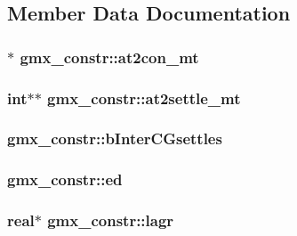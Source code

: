 \subsection{\-Member \-Data \-Documentation}
\hypertarget{structgmx__constr_a05db09c4cf1f83756a9221938a5a03ef}{
\subsubsection[{at2con\-\_\-mt}]{$\ast$ {\bf gmx\-\_\-constr\-::at2con\-\_\-mt}}}\label{structgmx__constr_a05db09c4cf1f83756a9221938a5a03ef}
\hypertarget{structgmx__constr_a0fdb6ced423b2244abcd97464072fcc3}{
\subsubsection[{at2settle\-\_\-mt}]{\setlength{\rightskip}{0pt plus 5cm}int$\ast$$\ast$ {\bf gmx\-\_\-constr\-::at2settle\-\_\-mt}}}\label{structgmx__constr_a0fdb6ced423b2244abcd97464072fcc3}
\hypertarget{structgmx__constr_a830754a1c3d082b498abd4963512d910}{
\subsubsection[{b\-Inter\-C\-Gsettles}]{ {\bf gmx\-\_\-constr\-::b\-Inter\-C\-Gsettles}}}\label{structgmx__constr_a830754a1c3d082b498abd4963512d910}
\hypertarget{structgmx__constr_a2657093756e8a2c839eadbbe2eebae08}{
\subsubsection[{ed}]{ {\bf gmx\-\_\-constr\-::ed}}}\label{structgmx__constr_a2657093756e8a2c839eadbbe2eebae08}
\hypertarget{structgmx__constr_a80ad171f739213af1da38cf2e18690f6}{
\subsubsection[{lagr}]{\setlength{\rightskip}{0pt plus 5cm}real$\ast$ {\bf gmx\-\_\-constr\-::lagr}}}\label{structgmx__constr_a80ad171f739213af1da38cf2e18690f6}
